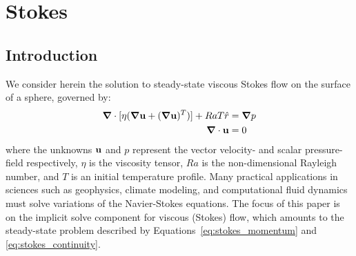 
\chapter{Stokes}

\section{Introduction}

We consider herein the solution to steady-state viscous Stokes flow on the surface of a sphere, governed by: 
  \begin{align}
\mbox{\boldmath$ \nabla $} \cdot [\eta(\mbox{\boldmath$ \nabla $} \mathbf{u} + (\mbox{\boldmath$ \nabla $} \mathbf{u})^T)] + Ra T \hat{r} & = \mbox{\boldmath$ \nabla $} p \label{eq:stokes_momentum} \\
\mbox{\boldmath$ \nabla $} \cdot \mathbf{u} & = 0 \label{eq:stokes_continuity} 
\end{align}
where the unknowns $\mathbf{u}$ and $p$ represent the vector velocity- and scalar pressure-field respectively, $\eta$ is the viscosity tensor, $Ra$ is the non-dimensional Rayleigh number, and $T$ is an initial temperature profile. Many practical applications in sciences such as geophysics, climate modeling, and computational fluid dynamics must solve variations of the Navier-Stokes equations. The focus of this paper is on the implicit solve component for viscous (Stokes) flow, which amounts to the steady-state problem described by Equations~\ref{eq:stokes_momentum} and \ref{eq:stokes_continuity}. 


